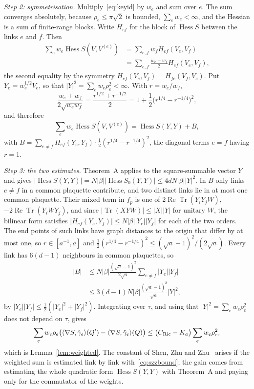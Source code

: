 \documentclass[aps,prd,twocolumn,superscriptaddress,nofootinbib,longbibliography,floatfix,amsmath,amssymb,10pt]{revtex4-2}
\theoremstyle{definition}
\theoremstyle{remark}
\newcommand{\Tr}{\operatorname{Tr}}
\newcommand{\ReTr}{\operatorname{Re}\operatorname{Tr}}
\newcommand{\Hess}{\operatorname{Hess}}
\newcommand{\ip}[2]{\langle #1,#2\rangle}
\begin{document}
\emph{Step 2: symmetrisation.} Multiply~\eqref{eq:keyid} by $w_e$ and sum over
$e$. The sum converges absolutely, because $\rho_e\le\pi\sqrt2$ is bounded,
$\sum_ew_e<\infty$, and the Hessian is a sum of finite-range blocks. Write
$H_{ef}$ for the block of $\Hess S$ between the links $e$ and $f$. Then
\[
\begin{aligned}
\sum_ew_e\Hess S(V,V^{(e)})&=\sum_{e,f}w_fH_{ef}(V_e,V_f)\\
&=\sum_{e,f}\frac{w_e+w_f}2H_{ef}(V_e,V_f),
\end{aligned}
\]
the second equality by the symmetry $H_{ef}(V_e,V_f)=H_{fe}(V_f,V_e)$. Put
$Y_e=w_e^{1/2}V_e$, so that $|Y|^2=\sum_ew_e\rho_e^2<\infty$. With
$r=w_e/w_f$,
\[
\frac{w_e+w_f}{2\sqrt{w_ew_f}}=\frac{r^{1/2}+r^{-1/2}}2=1+\frac12\bigl(r^{1/4}
-r^{-1/4}\bigr)^2,
\]
and therefore
\[
\sum_ew_e\Hess S(V,V^{(e)})=\Hess S(Y,Y)+B,
\]
with $B=\sum_{e\ne f}H_{ef}(Y_e,Y_f)\cdot\frac12(r^{1/4}-r^{-1/4})^2$, the
diagonal terms $e=f$ having $r=1$.

\emph{Step 3: the two estimates.} Theorem~A applies to the square-summable
vector $Y$ and gives $|\Hess S(Y,Y)|=N|\beta||\Hess S_0(Y,Y)|\le4dN|\beta|
|Y|^2$. In $B$ only links $e\ne f$ in a common plaquette contribute, and two
distinct links lie in at most one common plaquette. Their mixed term in
$f_p$ is one of $2\ReTr(Y_iY_jW)$, $-2\ReTr(Y_iWY_j)$, and since
$|\Tr(XYW)|\le|X||Y|$ for unitary $W$, the bilinear form satisfies
$|H_{ef}(Y_e,Y_f)|\le N|\beta||Y_e||Y_f|$ for each of the two orders. The
end points of such links have graph distances to the origin that differ by at
most one, so $r\in[a^{-1},a]$ and $\frac12(r^{1/4}-r^{-1/4})^2\le(\sqrt a-1)^2/
(2\sqrt a)$. Every link has $6(d-1)$ neighbours in common plaquettes, so
\[
\begin{aligned}
|B|&\le N|\beta|\frac{(\sqrt a-1)^2}{2\sqrt a}\sum_{e\ne f}|Y_e||Y_f|\\
&\le3(d-1)N|\beta|\frac{(\sqrt a-1)^2}{\sqrt a}|Y|^2,
\end{aligned}
\]
by $|Y_e||Y_f|\le\frac12(|Y_e|^2+|Y_f|^2)$. Integrating over $\tau$, and using
that $|Y|^2=\sum_ew_e\rho_e^2$ does not depend on $\tau$, gives
\[
\sum_ew_e\rho_e\bigl(\ip{\nabla S}{\hat\gamma_e}(Q')-\ip{\nabla S}{\hat
\gamma_e}(Q)\bigr)\le\bigl(C_{\rm Ric}-K_a\bigr)\sum_ew_e\rho_e^2,
\]
which is Lemma~\ref{lem:weighted}. The constant of Shen, Zhu and
Zhu~\cite[Sec.~5]{SZZ23} arises if the weighted sum is estimated link by link
with~\eqref{eq:szzbound}; the gain comes from estimating the whole quadratic
form $\Hess S(Y,Y)$ with Theorem~A and paying only for the commutator of the
weights.
\end{document}
